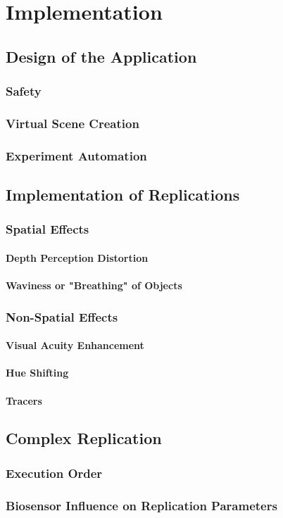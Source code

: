 \chapter{Implementation}
\vspace{-1.6em}
%

\minitoc
\thispagestyle{empty}
\newpage

\section{Design of the Application}
\subsection{Safety}
\subsection{Virtual Scene Creation}
\subsection{Experiment Automation}
\section{Implementation of Replications}
\subsection{Spatial Effects}
\subsubsection{Depth Perception Distortion}
\subsubsection{Waviness or "Breathing" of Objects}
\subsection{Non-Spatial Effects}
\subsubsection{Visual Acuity Enhancement}
\subsubsection{Hue Shifting}
\subsubsection{Tracers}
\section{Complex Replication}
\subsection{Execution Order}
\subsection{Biosensor Influence on Replication Parameters}
